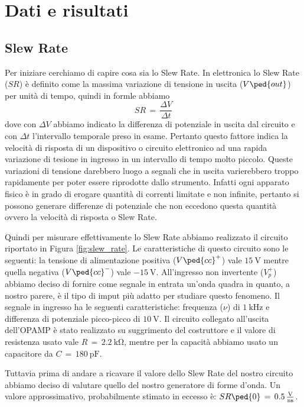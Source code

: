 \section*{Dati e risultati}

\subsection*{Slew Rate}

Per iniziare cerchiamo di capire cosa sia lo Slew Rate. In elettronica lo Slew Rate ($SR$) è definito come la massima variazione di tensione in uscita ($V\ped{out}$) per unità di tempo, quindi in formle abbiamo
\begin{equation}
	SR\,=\,\frac{\Delta V}{\Delta t}
	\label{slew_rate_equation}
\end{equation}
dove con $\Delta V$ abbiamo indicato la differenza di potenziale in uscita dal circuito e con $\Delta t$ l'intervallo temporale preso in esame.
Pertanto questo fattore indica la velocità di risposta di un dispositivo o circuito elettronico ad una rapida variazione di tesione in ingresso in un intervallo di tempo molto piccolo. Queste variazioni di tensione darebbero luogo a segnali che in uscita varierebbero troppo rapidamente per poter essere riprodotte dallo strumento. Infatti ogni apparato fisico è in grado di erogare quantità di correnti limitate e non infinite, pertanto si possono generare differenze di potenziale che non eccedono questa quantità ovvero la velocità di risposta o Slew Rate.

Quindi per misurare effettivamente lo Slew Rate abbiamo realizzato il circuito riportato in Figura \ref{fig:slew_rate}. Le caratteristiche di questo circuito sono le seguenti: la tensione di alimentazione positiva ($V\ped{cc}^+$) vale $\SI{+15}{\volt}$ mentre quella negativa ($V\ped{cc}^-$) vale $\SI{-15}{\volt}$. All'ingresso non invertente ($V_p^+$) abbiamo deciso di fornire come segnale in entrata un'onda quadra in quanto, a nostro parere, è il tipo di imput più adatto per studiare questo fenomeno. Il segnale in ingresso ha le seguenti caratteristiche: frequenza ($\nu$) di $\SI{1}{\kilo\hertz}$ e differenza di potenziale picco-picco di $\SI{10}{\volt}$. Il circuito collegato all'uscita dell'OPAMP è stato realizzato su suggrimento del costruttore e il valore di resistenza usato vale $R\,=\,\SI{2.2}{\kilo\ohm}$, mentre per la capacità abbiamo usato un capacitore da $C\,=\,\SI{180}{\pico\farad}$.

Tuttavia prima di andare a ricavare il valore dello Slew Rate del nostro circuito abbiamo deciso di valutare quello del nostro generatore di forme d'onda. Un valore approssimativo, probabilmente stimato in eccesso è: $SR\ped{0}\,=\,0.5\,\frac{\SI{}{\volt}}{\SI{}{\nano\second}}$.

